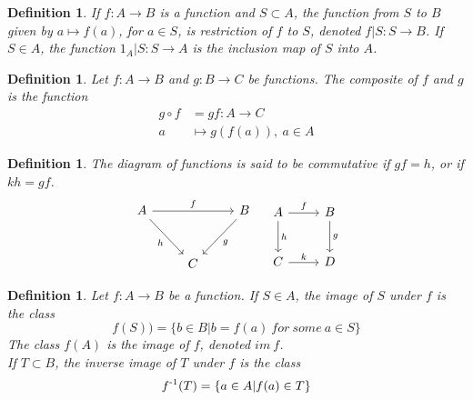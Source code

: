 \documentclass[a4paper,sfsidenotes,openany]{tufte-book}
\theoremstyle{theorem}
\newtheorem{definition}[theorem]{Definition}
\begin{document}
\begin{fullwidth}
\begin{definition}
If $ f: A \rightarrow B $ is a function and $ S \subset A$, the function from $ S $ to $ B $ given by $ a \mapsto f(a) $, for $ a \in S $, is \textit{{\color{blue} restriction}} of $ f $ to $ S $, denoted $ f|S: S \rightarrow B$.\newline
If $ S \in A$, the function $ 1_A | S: S \rightarrow A $ is the \textit{{\color{blue} inclusion map}} of $S$ into $A$.\\
\end{definition}
\>

\begin{definition}
Let $ f: A \rightarrow B $ and $ g: B \rightarrow C $ be functions. The \textit{{\color{blue} composite}} of $ f $ and $ g $ is the function
\begin{align}
g \circ f & = gf: A \rightarrow C \nonumber \\
a & \mapsto g(f(a)),\ a \in A
\end{align}
\end{definition}
\>

\begin{definition}
The \textit{{\color{blue} diagram of functions}} is said to be commutative if $ gf = h $, or if $ kh = gf $.\\

\begin{equation}
\label{diagram}
\begin{tikzcd}
A \arrow{rr}{f} \arrow[swap]{dr}{h} & & B \arrow{dl}{g} \\[10pt]
    & C
\end{tikzcd}
\quad
\begin{tikzcd}[row sep=2.5em]
 A \ar{r}{f} \ar{d}{h} & B \ar{d}{g} \\
 C \ar{r}{k} & D
\end{tikzcd}
\nonumber
\end{equation}
\end{definition}
\>

\begin{definition}
Let $ f: A \rightarrow B $ be a function. If $ S \in A $, \textit{{\color{blue} the image of $ S $ under $ f $}} is the class
\begin{equation}
f(S)) = \{ b \in B | b=f(a) \ for \ some \ a \in S\}
\end{equation}
The class $ f(A) $ is the \textit{{\color{blue} image of $ f $}}, denoted $ im \ f $.\\
If $ T \subset B $, the \textit{{\color{blue} inverse image of $ T $}} under $ f $ is the class 
\begin{equation}
f \textsuperscript{-1} (T) = \{ a \in A | f(a) \in T\} 
\end{equation}
\end{definition}
\>


\end{fullwidth}
\end{document}
